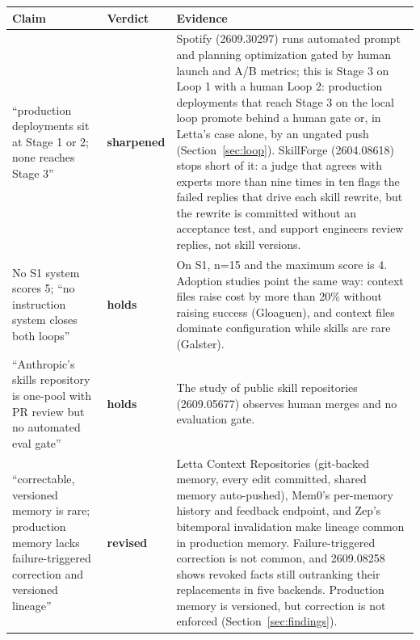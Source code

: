\documentclass[
  11pt,
]{article}
\newcounter{none} %
\begin{document}
{\def\LTcaptype{none} %
\begin{longtable}[]{@{}
  >{\raggedright\arraybackslash}p{}
  >{\raggedright\arraybackslash}p{}
  >{\raggedright\arraybackslash}p{}@{}}
\toprule\noalign{}
\begin{minipage}[b]{\linewidth}\raggedright
Claim
\end{minipage} & \begin{minipage}[b]{\linewidth}\raggedright
Verdict
\end{minipage} & \begin{minipage}[b]{\linewidth}\raggedright
Evidence
\end{minipage} \\
\midrule\noalign{}
\endhead
\bottomrule\noalign{}
\endlastfoot
``production deployments sit at Stage 1 or 2; none reaches Stage 3'' & \textbf{sharpened} & Spotify (2609.30297) runs automated prompt and planning optimization gated by human launch and A/B metrics; this is Stage 3 on Loop 1 with a human Loop 2: production deployments that reach Stage 3 on the local loop promote behind a human gate or, in Letta's case alone, by an ungated push (Section~\ref{sec:loop}). SkillForge (2604.08618) stops short of it: a judge that agrees with experts more than nine times in ten flags the failed replies that drive each skill rewrite, but the rewrite is committed without an acceptance test, and support engineers review replies, not skill versions. \\
No S1 system scores 5; ``no instruction system closes both loops'' & \textbf{holds} & On S1, n=15 and the maximum score is 4. Adoption studies point the same way: context files raise cost by more than 20\% without raising success (Gloaguen), and context files dominate configuration while skills are rare (Galster). \\
``Anthropic's skills repository is one-pool with PR review but no automated eval gate'' & \textbf{holds} & The study of public skill repositories (2609.05677) observes human merges and no evaluation gate. \\
``correctable, versioned memory is rare; production memory lacks failure-triggered correction and versioned lineage'' & \textbf{revised} & Letta Context Repositories (git-backed memory, every edit committed, shared memory auto-pushed), Mem0's per-memory history and feedback endpoint, and Zep's bitemporal invalidation make lineage common in production memory. Failure-triggered correction is not common, and 2609.08258 shows revoked facts still outranking their replacements in five backends. Production memory is versioned, but correction is not enforced (Section~\ref{sec:findings}). \\

\end{longtable}}
\end{document}
